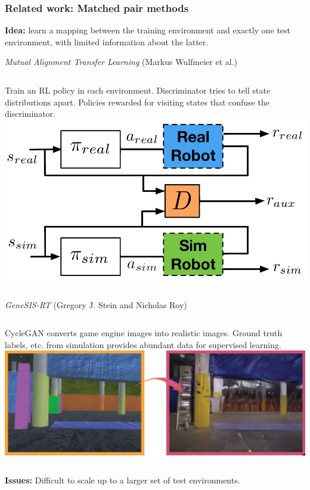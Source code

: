 \documentclass{beamer}
\begin{document}
\begin{frame}
\frametitle{Related work: Matched pair methods}
\textbf{Idea:} learn a mapping between the training environment
and exactly one test environment, with limited information about the latter.

\begin{block}{\emph{Mutual Alignment Transfer Learning} (Markus Wulfmeier et al.)}
\begin{columns}
Train an RL policy in each environment.
Discriminator tries to tell state distributions apart.
Policies rewarded for visiting states that confuse the discriminator.
\includegraphics[width=\columnwidth]{mutual-alignment.png}
\end{columns}
\end{block}

\begin{block}{\emph{GeneSIS-RT} (Gregory J. Stein and Nicholas Roy)}
\begin{columns}
CycleGAN converts game engine images into realistic images.
Ground truth labels, etc. from simulation provides abundant data for supervised learning.
\includegraphics[width=\columnwidth]{genesis-rt.png}
\end{columns}
\end{block}
\textbf{Issues:}
Difficult to scale up to a larger set of test environments.
\end{frame}
\end{document}
